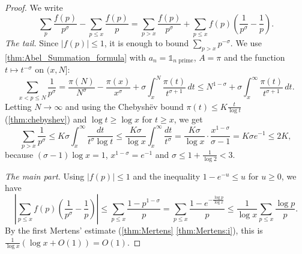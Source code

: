\begin{proof}
    We write
    \begin{equation*}
        \sum_{p}\frac{f(p)}{p^\sigma} - \sum_{p\le x}\frac{f(p)}{p} = \sum_{p> x}\frac{f(p)}{p^\sigma} + \sum_{p\le x}f(p)\left(\frac{1}{p^\sigma} - \frac1p\right).
    \end{equation*}
    \emph{The tail.} Since $\lvert f(p)\rvert\le 1$, it is enough to bound $\sum_{p>x}p^{-\sigma}$. We use \cref{thm:Abel_Summation_formula} with $a_n = \mathds{1}_{n \text{ prime}}$, $A = \pi$ and the function $t\mapsto t^{-\sigma}$ on $(x,N]$:
    \begin{equation*}
        \sum_{x<p\le N}\frac{1}{p^\sigma} = \frac{\pi(N)}{N^\sigma} - \frac{\pi(x)}{x^\sigma} + \sigma\int_x^N\frac{\pi(t)}{t^{\sigma+1}}\,dt \le N^{1-\sigma} + \sigma\int_x^\infty\frac{\pi(t)}{t^{\sigma+1}}\,dt.
    \end{equation*}
    Letting $N\to\infty$ and using the Chebyshëv bound $\pi(t)\le K\frac{t}{\log t}$ (\cref{thm:chebyshev}) and $\log t\ge\log x$ for $t \ge x$, we get
    \begin{equation*}
        \sum_{p>x}\frac{1}{p^\sigma}\le K\sigma\int_x^\infty\frac{dt}{t^\sigma\log t}\le\frac{K\sigma}{\log x}\int_x^\infty\frac{dt}{t^\sigma} = \frac{K\sigma}{\log x}\cdot\frac{x^{1-\sigma}}{\sigma-1} = K\sigma e^{-1}\le 2K,
    \end{equation*}
    because $(\sigma-1)\log x = 1$, $x^{1-\sigma} = e^{-1}$ and $\sigma \le 1 + \frac1{\log 2}<3$.

    \emph{The main part.} Using $\lvert f(p)\rvert\le 1$ and the inequality $1-e^{-u} \le u$ for $u \ge 0$, we have
    \begin{equation*}
        \left\lvert \sum_{p \le x} f(p)\left(\frac{1}{p^\sigma} - \frac1p\right) \right\rvert \le\sum_{p \le x} \frac{1-p^{1-\sigma}}{p} = \sum_{ p \le x}\frac{1 - e^{-\frac{\log p}{\log x}}}{p} \le \frac{1}{\log x}\sum_{ p \le x}\frac{\log p}{p }.
    \end{equation*}
    By the first Mertens' estimate (\cref{thm:Mertens} \ref{thm:Mertens:i}), this is $\frac{1}{\log x }\left(\log x + O(1)\right) = O(1)$.
\end{proof}

